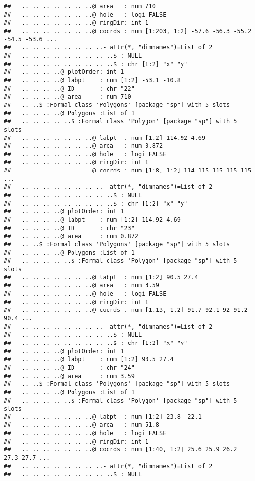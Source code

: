 \documentclass[]{article}
\begin{document}
\begin{verbatim}
##   .. .. .. .. .. .. ..@ area   : num 710
##   .. .. .. .. .. .. ..@ hole   : logi FALSE
##   .. .. .. .. .. .. ..@ ringDir: int 1
##   .. .. .. .. .. .. ..@ coords : num [1:203, 1:2] -57.6 -56.3 -55.2 -54.5 -53.6 ...
##   .. .. .. .. .. .. .. ..- attr(*, "dimnames")=List of 2
##   .. .. .. .. .. .. .. .. ..$ : NULL
##   .. .. .. .. .. .. .. .. ..$ : chr [1:2] "x" "y"
##   .. .. .. ..@ plotOrder: int 1
##   .. .. .. ..@ labpt    : num [1:2] -53.1 -10.8
##   .. .. .. ..@ ID       : chr "22"
##   .. .. .. ..@ area     : num 710
##   .. ..$ :Formal class 'Polygons' [package "sp"] with 5 slots
##   .. .. .. ..@ Polygons :List of 1
##   .. .. .. .. ..$ :Formal class 'Polygon' [package "sp"] with 5 slots
##   .. .. .. .. .. .. ..@ labpt  : num [1:2] 114.92 4.69
##   .. .. .. .. .. .. ..@ area   : num 0.872
##   .. .. .. .. .. .. ..@ hole   : logi FALSE
##   .. .. .. .. .. .. ..@ ringDir: int 1
##   .. .. .. .. .. .. ..@ coords : num [1:8, 1:2] 114 115 115 115 115 ...
##   .. .. .. .. .. .. .. ..- attr(*, "dimnames")=List of 2
##   .. .. .. .. .. .. .. .. ..$ : NULL
##   .. .. .. .. .. .. .. .. ..$ : chr [1:2] "x" "y"
##   .. .. .. ..@ plotOrder: int 1
##   .. .. .. ..@ labpt    : num [1:2] 114.92 4.69
##   .. .. .. ..@ ID       : chr "23"
##   .. .. .. ..@ area     : num 0.872
##   .. ..$ :Formal class 'Polygons' [package "sp"] with 5 slots
##   .. .. .. ..@ Polygons :List of 1
##   .. .. .. .. ..$ :Formal class 'Polygon' [package "sp"] with 5 slots
##   .. .. .. .. .. .. ..@ labpt  : num [1:2] 90.5 27.4
##   .. .. .. .. .. .. ..@ area   : num 3.59
##   .. .. .. .. .. .. ..@ hole   : logi FALSE
##   .. .. .. .. .. .. ..@ ringDir: int 1
##   .. .. .. .. .. .. ..@ coords : num [1:13, 1:2] 91.7 92.1 92 91.2 90.4 ...
##   .. .. .. .. .. .. .. ..- attr(*, "dimnames")=List of 2
##   .. .. .. .. .. .. .. .. ..$ : NULL
##   .. .. .. .. .. .. .. .. ..$ : chr [1:2] "x" "y"
##   .. .. .. ..@ plotOrder: int 1
##   .. .. .. ..@ labpt    : num [1:2] 90.5 27.4
##   .. .. .. ..@ ID       : chr "24"
##   .. .. .. ..@ area     : num 3.59
##   .. ..$ :Formal class 'Polygons' [package "sp"] with 5 slots
##   .. .. .. ..@ Polygons :List of 1
##   .. .. .. .. ..$ :Formal class 'Polygon' [package "sp"] with 5 slots
##   .. .. .. .. .. .. ..@ labpt  : num [1:2] 23.8 -22.1
##   .. .. .. .. .. .. ..@ area   : num 51.8
##   .. .. .. .. .. .. ..@ hole   : logi FALSE
##   .. .. .. .. .. .. ..@ ringDir: int 1
##   .. .. .. .. .. .. ..@ coords : num [1:40, 1:2] 25.6 25.9 26.2 27.3 27.7 ...
##   .. .. .. .. .. .. .. ..- attr(*, "dimnames")=List of 2
##   .. .. .. .. .. .. .. .. ..$ : NULL

\end{verbatim}
\end{document}

